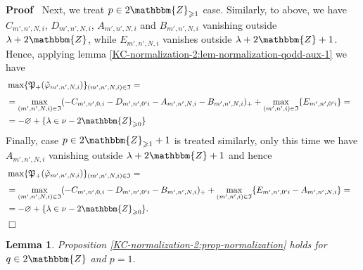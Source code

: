 \documentclass{article}
\newenvironment{proof}{\noindent\textbf{Proof\ }}{\hspace*{\fill}$\Box$\medskip}
\numberwithin{definition}{section}
\newtheorem{lemma}{Lemma}
\numberwithin{lemma}{section}
\numberwithin{proposition}{section}
{\theorembodyfont{\rmfamily}\newtheorem{remark}{Remark}
\numberwithin{remark}{section}
}
\begin{document}
\begin{proof}
  Next, we treat $p \in 2\mathbbm{Z}_{\geqslant 1}$ case. Similarly, to above,
  we have $C_{m', n', N, i}$, $D_{m', n', N, i}$, $A_{m', n', N, i}$ and
  $B_{m', n', N, i}$ vanishing outside $\lambda + 2\mathbbm{Z}$, while $E_{m',
  n', N, i}$ vanishes outside $\lambda + 2\mathbbm{Z}+ 1$. Hence, applying
  lemma \ref{KC-normalization-2:lem-normalization-qodd-aux-1} we have
  \begin{eqnarray}
    & \max_{} \{ \mathfrak{P}_+ ( \tilde{\varphi}_{m', n', N, i}) \}_{( m',
    n', N, i) \in \mathfrak{I}} = &  \nonumber\\
    & = \max_{( m', n', N, i) \in \mathfrak{I}} ( - C_{m', n', 0, i} - D_{m',
    n', 0' i} - A_{m', n', N, i} - B_{m', n', N, i})_+ + \max_{( m', n', i)
    \in \mathfrak{I}} \{ E_{m', n', 0' i} \} = &  \nonumber\\
    & = - \varnothing + \{ \lambda \in \nu - 2\mathbbm{Z}_{\geqslant 0} \} & 
    \nonumber
  \end{eqnarray}
  Finally, case $p \in 2\mathbbm{Z}_{\geqslant 1} + 1$ is treated similarly,
  only this time we have $A_{m', n', N, i}$ vanishing outside $\lambda +
  2\mathbbm{Z}+ 1$ and hence
  \begin{eqnarray}
    & \max_{} \{ \mathfrak{P}_+ ( \tilde{\varphi}_{m', n', N, i}) \}_{( m',
    n', N, i) \in \mathfrak{I}} = &  \nonumber\\
    & = \max_{( m', n', N, i) \in \mathfrak{I}} ( - C_{m', n', 0, i} - D_{m',
    n', 0' i} - B_{m', n', N, i})_+ + \max_{( m', n', i) \in \mathfrak{I}} \{
    E_{m', n', 0' i} - A_{m', n', N, i} \} = &  \nonumber\\
    & = - \varnothing + \{ \lambda \in \nu - 2\mathbbm{Z}_{\geqslant 0} \} .
    &  \nonumber
  \end{eqnarray}
\end{proof}

\begin{lemma}
  \label{KC-normalization-2:lem-normalization-q-even-p-1}Proposition
  \ref{KC-normalization-2:prop-normalization} holds for $q \in 2\mathbbm{Z}$
  and $p = 1$.
\end{lemma}
\end{document}
